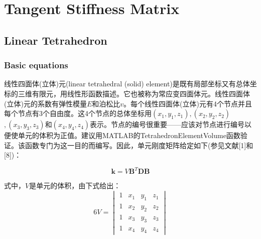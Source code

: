 
\chapter{Tangent Stiffness Matrix}
\section{Linear Tetrahedron}
\subsection{Basic equations}
\begin{CJK*}{UTF8}{song} %
线性四面体(立体)元(linear tetrahedral (solid) element)是既有局部坐标又有总体坐标的三维有限元，用线性形函数描述。它也被称为常应变四面体元。线性四面体(立体)元的系数有弹性模量$ E $和泊松比$ v $。每个线性四面体(立体)元有\num{4}个节点并且每个节点有\num{3}个自由度。这\num{4}个节点的总体坐标用$ (x_1, y_1,z_1), (x_2,y_2,z_2) $ $, (x_3,y_3,z_3) $和$ (x_4,y_4,z_4) $表示。节点的编号很重要——应该对节点进行编号以便使单元的体积为正值。建议用MATLAB的TetrahedronElementVolume函数验证。该函数专门为这一目的而编写。因此，单元刚度矩阵给定如下(参见文献[1]和[8])：

\begin{equation} \label{eq: k definition}
\mathbf{k} = V \mathbf{B}^T \mathbf{D} \mathbf{B}
\end{equation}

式中，$ V $是单元的体积，由下式给出：
\begin{equation}
6V = \begin{vmatrix}
1 & x_1 & y_1 & z_1 \\ 
1 & x_2 & y_2 & z_2 \\ 
1 & x_3 & y_3 & z_3 \\ 
1 & x_4 & y_4 & z_4
\end{vmatrix} 
\end{equation}


\end{CJK*}

